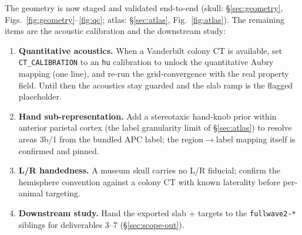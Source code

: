 \documentclass{compactarticle}
\begin{document}
The geometry is now staged and validated end-to-end (skull:
\S\ref{sec:geometry}, Figs.~\ref{fig:geometry}--\ref{fig:qc}; atlas:
\S\ref{sec:atlas}, Fig.~\ref{fig:atlas}). The remaining items are the
acoustic calibration and the downstream study:
\begin{enumerate}[leftmargin=*]
\setlength\itemsep{0pt}
  \item \textbf{Quantitative acoustics.} When a Vanderbilt colony CT is
        available, set \texttt{CT\_CALIBRATION} to an \texttt{hu}
        calibration to unlock the quantitative Aubry mapping (one line),
        and re-run the grid-convergence with the real property field.
        Until then the acoustics stay guarded and the slab ramp is the
        flagged placeholder.
  \item \textbf{Hand sub-representation.} Add a stereotaxic
        hand-knob prior within anterior parietal cortex (the label
        granularity limit of \S\ref{sec:atlas}) to resolve areas 3b/1
        from the bundled APC label; the region$\to$label mapping itself
        is confirmed and pinned.
  \item \textbf{L/R handedness.} A museum skull carries no L/R fiducial;
        confirm the hemisphere convention against a colony CT with known
        laterality before per-animal targeting.
  \item \textbf{Downstream study.} Hand the exported slab + targets to
        the \texttt{fullwave2-*} siblings for deliverables 3--7
        (\S\ref{sec:scope-out}).
\end{enumerate}
\end{document}

